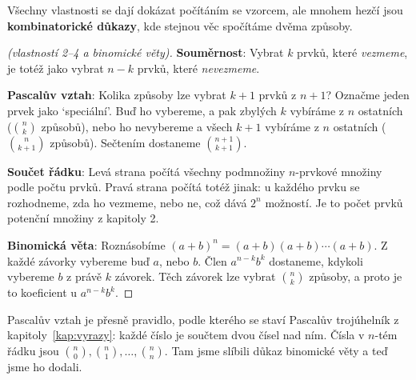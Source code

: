Všechny vlastnosti se dají dokázat počítáním se vzorcem, ale mnohem hezčí jsou \textbf{kombinatorické důkazy}, kde stejnou věc spočítáme dvěma způsoby.

\begin{proof}[(vlastností 2--4 a binomické věty)]
  \textbf{Souměrnost}: Vybrat $k$ prvků, které \textit{vezmeme}, je totéž jako vybrat $n - k$ prvků, které \textit{nevezmeme}.

  \textbf{Pascalův vztah}: Kolika způsoby lze vybrat $k + 1$ prvků z $n + 1$? Označme jeden prvek jako `speciální'. Buď ho vybereme, a pak zbylých $k$ vybíráme z $n$ ostatních ($\binom{n}{k}$ způsobů), nebo ho nevybereme a všech $k + 1$ vybíráme z $n$ ostatních ($\binom{n}{k + 1}$ způsobů). Sečtením dostaneme $\binom{n + 1}{k + 1}$.

  \textbf{Součet řádku}: Levá strana počítá všechny podmnožiny $n$-prvkové množiny podle počtu prvků. Pravá strana počítá totéž jinak: u každého prvku se rozhodneme, zda ho vezmeme, nebo ne, což dává $2^n$ možností. Je to počet prvků potenční množiny z kapitoly 2.

  \textbf{Binomická věta}: Roznásobíme ${(a + b)}^n = (a + b)(a + b)\cdots(a + b)$. Z každé závorky vybereme buď $a$, nebo $b$. Člen $a^{n-k}b^k$ dostaneme, kdykoli vybereme $b$ z právě $k$ závorek. Těch závorek lze vybrat $\binom{n}{k}$ způsoby, a proto je to koeficient u $a^{n-k}b^k$.
\end{proof}

Pascalův vztah je přesně pravidlo, podle kterého se staví Pascalův trojúhelník z kapitoly~\ref{kap:vyrazy}: každé číslo je součtem dvou čísel nad ním. Čísla v $n$-tém řádku jsou $\binom{n}{0}, \binom{n}{1}, \ldots, \binom{n}{n}$. Tam jsme slíbili důkaz binomické věty a teď jsme ho dodali.
\begin{center}
\end{center}

